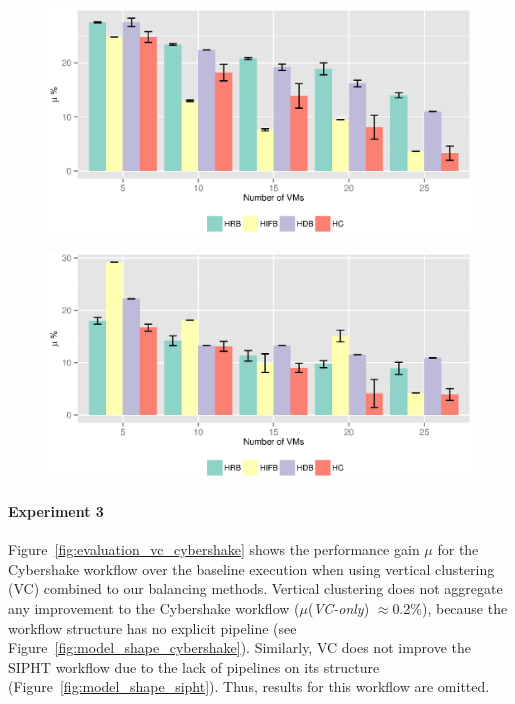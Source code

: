 \begin{figure}[!htb]
	\centering
	\includegraphics[width=0.8\linewidth]{figures/balance/figure22.eps}
	\label{fig:evaluation_resource_1}
\end{figure}

\begin{figure}[!htb]
	\centering
	\includegraphics[width=0.8\linewidth]{figures/balance/figure23.eps}
	\label{fig:evaluation_resource_2}
\end{figure}


\paragraph{\textbf{Experiment 3}}
Figure~\ref{fig:evaluation_vc_cybershake} shows the performance gain $\mu$ for the Cybershake workflow over the baseline execution when using vertical clustering (VC) combined to our balancing methods. Vertical clustering does not aggregate any improvement to the Cybershake workflow ($\mu$(\emph{VC-only}) $\approx 0.2\%$), because the workflow structure has no explicit pipeline (see Figure~\ref{fig:model_shape_cybershake}). Similarly, VC does not improve the SIPHT workflow due to the lack of pipelines on its structure (Figure~\ref{fig:model_shape_sipht}). Thus, results for this workflow are omitted.


